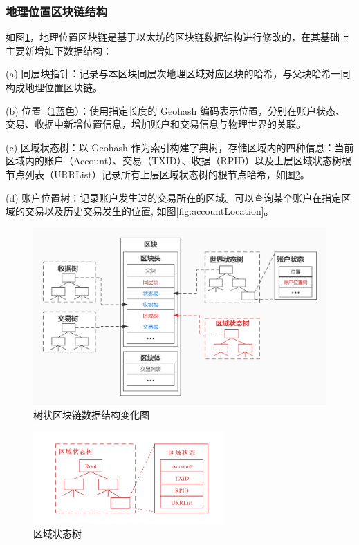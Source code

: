 \subsubsection{地理位置区块链结构}
如图\ref{fig:treeBlockchain}，地理位置区块链是基于以太坊的区块链数据结构进行修改的，在其基础上主要新增如下数据结构：\par
(a) 同层块指针：记录与本区块同层次地理区域对应区块的哈希，与父块哈希一同构成地理位置区块链。\par
(b) 位置（\ref{fig:treeBlockchain}蓝色）：使用指定长度的 Geohash 编码表示位置，分别在账户状态、交易、收据中新增位置信息，增加账户和交易信息与物理世界的关联。\par
(c) 区域状态树：以 Geohash 作为索引构建字典树，存储区域内的四种信息：当前区域内的账户（Account）、交易（TXID）、收据（RPID）以及上层区域状态树根节点列表（URRList）记录所有上层区域状态树的根节点哈希，如图\ref{fig:regionState}。\par
(d) 账户位置树：记录账户发生过的交易所在的区域。可以查询某个账户在指定区域的交易以及历史交易发生的位置, 如图\ref{fig:accountLocation}。\par

\begin{figure}
  \centering
  \includegraphics[width=1.0\textwidth]{figures/树状区块链}
  \caption{树状区块链数据结构变化图}\label{fig:treeBlockchain}
\end{figure}

\begin{figure}
  \centering
  \includegraphics[width=0.65\textwidth]{figures/区域状态树}
  \caption{区域状态树}\label{fig:regionState}
\end{figure}

